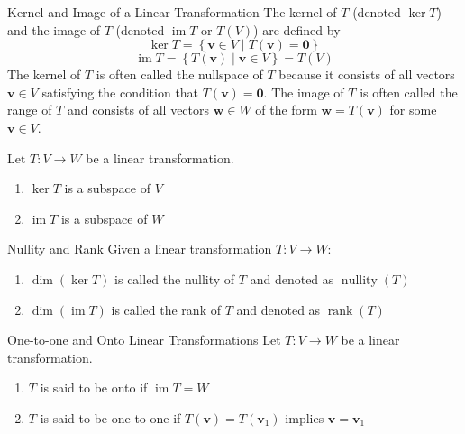 \documentclass[12pt]{article}
\begin{document}
\begin{definition}{Kernel and Image of a Linear Transformation}{}
    The kernel of $ T $ (denoted $ \ker T $) and the image of $ T $ (denoted $ \operatorname{im} T $ or $ T \left( V \right) $) are defined by
    \[ \ker T = \left\{ \mathbf{v} \in V \mid T \left( \mathbf{v} \right) = \mathbf{0} \right\} \]
    \[ \operatorname{im} T = \left\{ T \left( \mathbf{v} \right) \mid \mathbf{v} \in V \right\} = T \left( V \right) \]
    The kernel of $ T $ is often called the nullspace of $ T $ because it consists of all vectors $ \mathbf{v} \in V $ satisfying the condition that $ T \left( \mathbf{v} \right) = \mathbf{0} $. The image of $ T $ is often called the range of $ T $ and consists of all vectors $ \mathbf{w} \in W $ of the form $ \mathbf{w} = T \left( \mathbf{v} \right) $ for some $ \mathbf{v} \in V $.
\end{definition}

\begin{theorem}{}{}
    Let $ T : V \to W $ be a linear transformation.
    \begin{enumerate}[label=(\roman*)]
        \item $ \ker T $ is a subspace of $ V $
        \item $ \operatorname{im} T $ is a subspace of $ W $
    \end{enumerate}
\end{theorem}

\begin{definition}{Nullity and Rank}{}
    Given a linear transformation $ T : V \to W $:
    \begin{enumerate}[label=(\roman*)]
        \item $ \dim \left( \ker T \right) $ is called the nullity of $ T $ and denoted as $ \operatorname{nullity} \left( T \right) $
        \item $ \dim \left( \operatorname{im} T \right) $ is called the rank of $ T $ and denoted as $ \operatorname{rank} \left( T \right) $
    \end{enumerate}
\end{definition}

\begin{definition}{One-to-one and Onto Linear Transformations}{}
    Let $ T : V \to W $ be a linear transformation.
    \begin{enumerate}[label=(\roman*)]
        \item $ T $ is said to be onto if $ \operatorname{im} T = W $
        \item $ T $ is said to be one-to-one if $ T \left( \mathbf{v} \right) = T \left( \mathbf{v}_1 \right) $ implies $ \mathbf{v} = \mathbf{v}_1 $
    \end{enumerate}
\end{definition}
\end{document}
